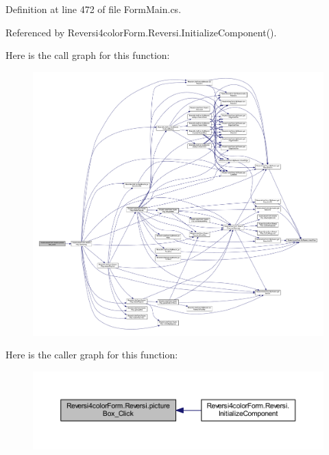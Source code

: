 Definition at line 472 of file Form\+Main.\+cs.



Referenced by Reversi4color\+Form.\+Reversi.\+Initialize\+Component().

Here is the call graph for this function\+:
\nopagebreak
\begin{figure}[H]
\begin{center}
\leavevmode
\includegraphics[width=350pt]{class_reversi4color_form_1_1_reversi_af0467d1e6e97eab2d7f6f12384129135_cgraph}
\end{center}
\end{figure}
Here is the caller graph for this function\+:
\nopagebreak
\begin{figure}[H]
\begin{center}
\leavevmode
\includegraphics[width=350pt]{class_reversi4color_form_1_1_reversi_af0467d1e6e97eab2d7f6f12384129135_icgraph}
\end{center}
\end{figure}
\mbox{\label{class_reversi4color_form_1_1_reversi_afacffb0f4d383892677acfd1b7304606}} 
